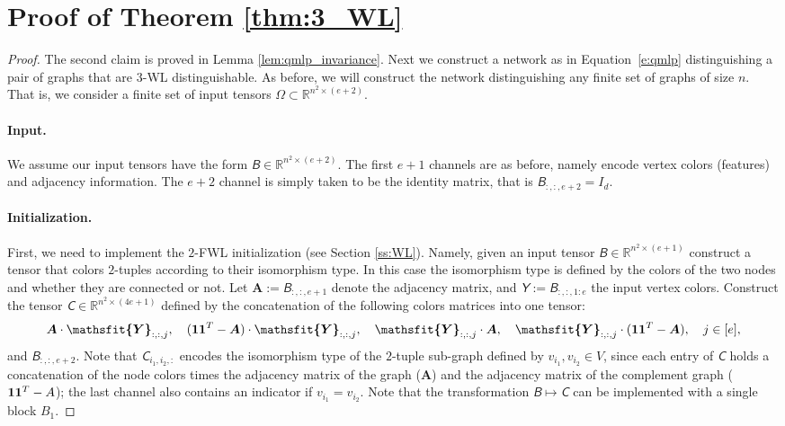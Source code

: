 \documentclass{article}
\newcommand{\Real}{\mathbb R}
\def\Eqref#1{Equation~\ref{#1}}
\def\mA{{\bm{A}}}
\newcommand{\tens}[1]{\bm{\mathsfit{#1}}}
\def\tB{{\tens{B}}}
\def\tC{{\tens{C}}}
\def\tY{{\tens{Y}}}
\begin{document}
\section{Proof of Theorem \ref{thm:3_WL}}\label{app:thm2}


\begin{proof}
The second claim is proved in Lemma \ref{lem:qmlp_invariance}. Next we construct a network as in \Eqref{e:qmlp} distinguishing a pair of graphs that are $3$-WL distinguishable. As before, we will construct the network distinguishing any finite set of graphs of size $n$. That is, we consider a finite set of input tensors $\Omega\subset \Real^{n^2\times (e+2)}$.  

\paragraph{Input.}
We assume our input tensors have the form $\tB\in\Real^{n^2\times(e+2)}$. The first $e+1$ channels are as before, namely encode vertex colors (features) and adjacency information. The $e+2$ channel is simply taken to be the identity matrix, that is $\tB_{:,:,e+2} = I_d$.  


\paragraph{Initialization.}
First, we need to implement the $2$-FWL initialization (see Section \ref{ss:WL}). Namely, given an input tensor $\tB\in\Real^{n^2\times (e+1)}$ construct a tensor that colors $2$-tuples according to their isomorphism type. In this case the isomorphism type is defined by the colors of the two nodes and whether they are connected or not. Let $\mA:=\tB_{:,:,e+1}$ denote the adjacency matrix, and $\tY:=\tB_{:,:,1:e}$ the input vertex colors. Construct the tensor $\tC\in\Real^{n^2\times (4e+1)}$ defined by the concatenation of the following colors matrices into one tensor: $$\mA\cdot \tY_{:,:,j}, \quad (\one\one^T - \mA)\cdot \tY_{:,:,j}, \quad  \tY_{:,:,j}\cdot \mA, \quad \tY_{:,:,j}\cdot (\one\one^T - \mA), \quad  j\in[e],$$
and $\tB_{:,:,e+2}$.
Note that $\tC_{i_1,i_2,:}$ encodes the isomorphism type of the $2$-tuple sub-graph defined by $v_{i_1},v_{i_2}\in V$, since each entry of $\tC$ holds a concatenation of the node colors times the adjacency matrix of the graph ($\mA$) and the adjacency matrix of the complement graph ($\mathbf{1} \mathbf{1}^T-A$); the last channel also contains an indicator if $v_{i_1}=v_{i_2}$. Note that the transformation $\tB\mapsto \tC$ can be implemented with a single block $B_1$.



\end{proof}
\end{document}
